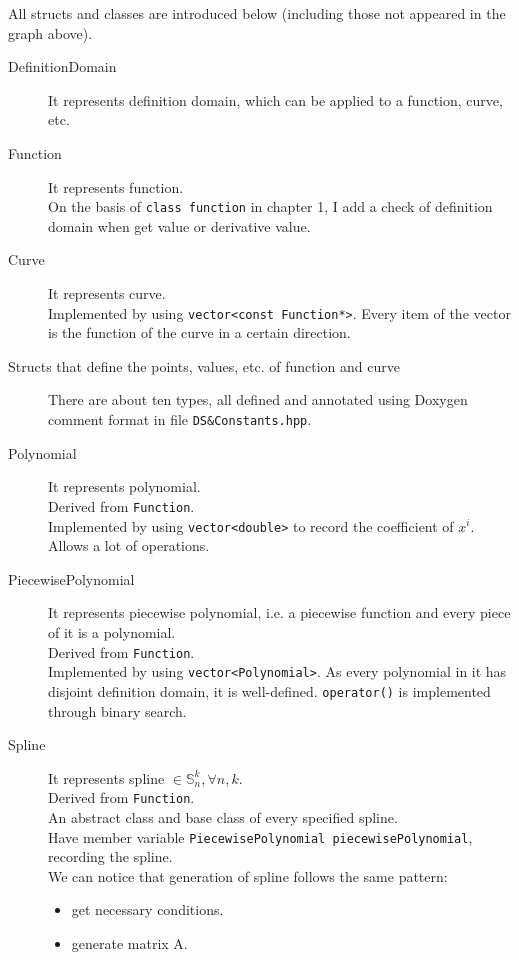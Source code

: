 \documentclass[a4paper]{article}
\begin{document}
All structs and classes are introduced below (including those not appeared in the graph above).
\begin{description}
  \item[DefinitionDomain] 
  It represents definition domain, which can be applied to a function, curve, etc.
  \item[Function] 
  It represents function. \\
  On the basis of \texttt{class function} in chapter 1, 
  I add a check of definition domain when get value or derivative value.
  \item[Curve] 
  It represents curve. \\
  Implemented by using \texttt{vector<const Function*>}. 
  Every item of the vector is the function of the curve in a certain direction.
  \item[Structs that define the points, values, etc. of function and curve]
  There are about ten types, all defined and annotated using Doxygen comment format in file \texttt{DS\&Constants.hpp}.
  \item[Polynomial] 
  It represents polynomial.\\
  Derived from \texttt{Function}.\\
  Implemented by using \texttt{vector<double>} to record the coefficient of $x^i$.\\
  Allows a lot of operations.
  \item[PiecewisePolynomial] 
  It represents piecewise polynomial, i.e. a piecewise function and every piece of it is a polynomial. \\ 
  Derived from \texttt{Function}.\\
  Implemented by using \texttt{vector<Polynomial>}. 
  As every polynomial in it has disjoint definition domain, it is well-defined.
  \texttt{operator()} is implemented through binary search.
  \item[Spline] 
  It represents spline $\in \mathbb{S}_n^k, \forall n,k$.\\
  Derived from \texttt{Function}.\\
  An abstract class and base class of every specified spline. \\
  Have member variable \texttt{PiecewisePolynomial piecewisePolynomial}, recording the spline.\\
  We can notice that generation of spline follows the same pattern:
  \begin{itemize}
    \item get necessary conditions.
    \item generate matrix A.

\end{itemize}
\end{description}
\end{document}
